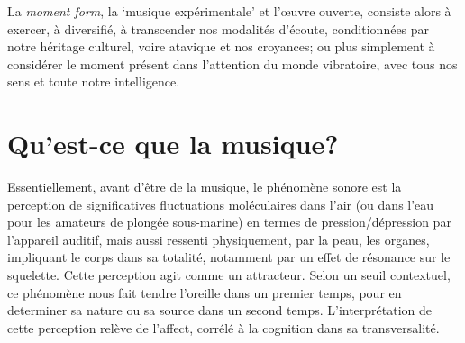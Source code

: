 \documentclass{article}
\begin{document}
La \textit{moment form}, la `musique expérimentale' et l'œuvre ouverte, consiste alors à exercer, à diversifié, à transcender nos modalités d'écoute, conditionnées par notre héritage culturel, voire atavique et nos croyances; ou plus simplement à considérer le moment présent dans l'attention du monde vibratoire, avec tous nos sens et toute notre intelligence.

\section{Qu’est-ce que la musique?}

Essentiellement, avant d'être de la musique, le phénomène sonore est la perception de significatives fluctuations moléculaires dans l'air (ou dans l'eau pour les amateurs de plongée sous-marine) en termes de pression/dépression par l'appareil auditif, mais aussi ressenti physiquement, par la peau, les organes, impliquant le corps dans sa totalité, notamment par un effet de résonance sur le squelette. 
Cette perception agit comme un attracteur. Selon un seuil contextuel, ce phénomène nous fait tendre l'oreille dans un premier temps, pour en determiner sa nature ou sa source dans un second temps.
L'interprétation de cette perception relève de l'affect, corrélé à la cognition dans sa transversalité.
\end{document}
